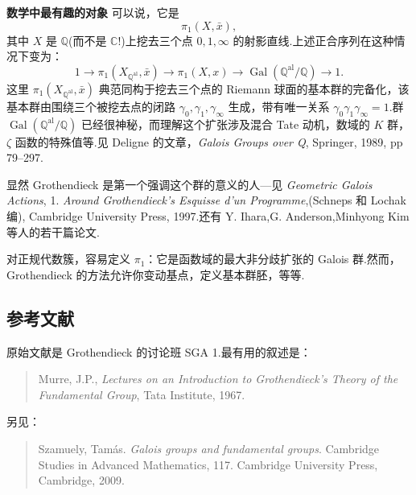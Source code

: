 \textbf{数学中最有趣的对象} 可以说，它是
\[
\pi_1(X, \bar{x}),
\]
其中 $X$ 是 $\mathbb{Q}$(而不是 $\mathbb{C}$!)上挖去三个点 $0, 1, \infty$ 的射影直线.上述正合序列在这种情况下变为：
\[
1 \to \pi_1(X_{\mathbb{Q}^{\mathrm{al}}}, \bar{x}) \to \pi_1(X, x) \to \operatorname{Gal}(\mathbb{Q}^{\mathrm{al}}/\mathbb{Q}) \to 1.
\]
这里 $\pi_1(X_{\mathbb{Q}^{\mathrm{al}}}, \bar{x})$ 典范同构于挖去三个点的 Riemann 球面的基本群的完备化，该基本群由围绕三个被挖去点的闭路 $\gamma_0, \gamma_1, \gamma_\infty$ 生成，带有唯一关系 $\gamma_0\gamma_1\gamma_\infty = 1$.群 $\operatorname{Gal}(\mathbb{Q}^{\mathrm{al}}/\mathbb{Q})$ 已经很神秘，而理解这个扩张涉及混合 Tate 动机，数域的 $K$ 群，$\zeta$ 函数的特殊值等.见 Deligne 的文章，\emph{Galois Groups over Q}, Springer, 1989, pp 79--297.

显然 Grothendieck 是第一个强调这个群的意义的人---见 \emph{Geometric Galois Actions}, 1. \emph{Around Grothendieck's Esquisse d'un Programme},(Schneps 和 Lochak 编), Cambridge University Press, 1997.还有 Y. Ihara,G. Anderson,Minhyong Kim 等人的若干篇论文.

\begin{aside}\label{asd:3.6}
对正规代数簇，容易定义 $\pi_1$：它是函数域的最大非分歧扩张的 Galois 群.然而，Grothendieck 的方法允许你变动基点，定义基本群胚，等等.
\end{aside}

\subsection*{参考文献}

原始文献是 Grothendieck 的讨论班 SGA 1.最有用的叙述是：
\begin{quote}
  Murre, J.P., \emph{Lectures on an Introduction to Grothendieck's Theory of the Fundamental Group}, Tata Institute, 1967.
\end{quote}
另见：
\begin{quote}
  Szamuely, Tam\'as. \emph{Galois groups and fundamental groups}. Cambridge Studies in Advanced Mathematics, 117. Cambridge University Press, Cambridge, 2009.
\end{quote}
